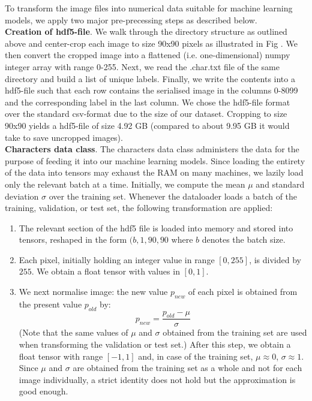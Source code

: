 \documentclass[british,12p]{article}
\begin{document}
    	To transform the image files into numerical data suitable for machine learning models, we apply two major pre-precessing steps as described below.\\
    	
    	
    	\textbf{Creation of hdf5-file}. We walk through the directory structure as outlined above and center-crop each image to size 90x90 pixels as illustrated in Fig . We then convert the cropped image into a flattened (i.e. one-dimensional) numpy integer array with range 0-255. Next, we read the .char.txt file of the same directory and build a list of unique labels. Finally, we write the contents into a hdf5-file such that each row contains the serialised image in the columns 0-8099 and the corresponding label in the last column. We chose the hdf5-file format over the standard csv-format due to the size of our dataset. Cropping to size 90x90 yields a hdf5-file of size 4.92 GB (compared to about 9.95 GB it would take to save uncropped images).\\
    	
    	
    	\textbf{Characters data class}. The characters data class administers the data for the purpose of feeding it into our machine learning models. Since loading the entirety of the data into tensors may exhaust the RAM on many machines, we lazily load only the relevant batch at a time. Initially, we compute the mean $\mu$ and standard deviation $\sigma$ over the training set. Whenever the dataloader loads a batch of the training, validation, or test set, the following transformation are applied:
    	\begin{enumerate}
    		\item The relevant section of the hdf5 file is loaded into memory and stored into tensors, reshaped in the form $(b, 1, 90, 90$ where $b$ denotes the batch size.
    		\item Each pixel, initially holding an integer value in range $[0, 255]$, is divided by $255$. We obtain a float tensor with values in $[0, 1]$.
    		\item We next normalise image: the new value $p_{new}$ of each pixel is obtained from the present value $p_{old}$ by: $$ p_{new} = \frac{p_{old} - \mu}{\sigma}$$ (Note that the same values of $\mu$ and $\sigma$  obtained from the training set are used when transforming the validation or test set.) After this step, we obtain a float tensor with range $[-1, 1]$ and, in case of the training set, $\mu \approx 0$, $\sigma \approx 1$. Since $\mu$ and $\sigma$ are obtained from the training set as a whole and not for each image individually, a strict identity does not hold but the approximation is good enough.
    	\end{enumerate}
    	
\end{document}
